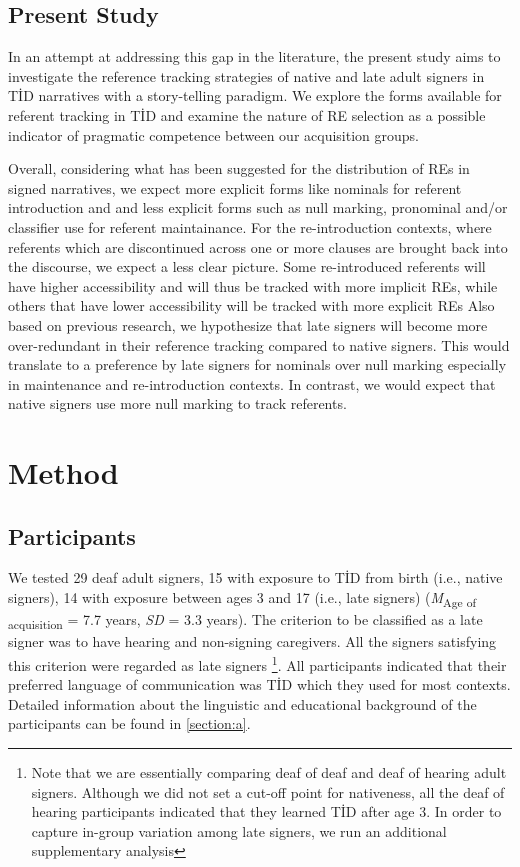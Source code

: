 \documentclass[]{elsarticle} %
\begin{document}
\hypertarget{present-study}{%
\subsection{Present Study}\label{present-study}}

In an attempt at addressing this gap in the literature, the present
study aims to investigate the reference tracking strategies of native
and late adult signers in TİD narratives with a story-telling paradigm.
We explore the forms available for referent tracking in TİD and examine
the nature of RE selection as a possible indicator of pragmatic
competence between our acquisition groups.

Overall, considering what has been suggested for the distribution of REs
in signed narratives, we expect more explicit forms like nominals for
referent introduction and and less explicit forms such as null marking,
pronominal and/or classifier use for referent maintainance. For the
re-introduction contexts, where referents which are discontinued across
one or more clauses are brought back into the discourse, we expect a
less clear picture. Some re-introduced referents will have higher
accessibility and will thus be tracked with more implicit REs, while
others that have lower accessibility will be tracked with more explicit
REs Also based on previous research, we hypothesize that late signers
will become more over-redundant in their reference tracking compared to
native signers. This would translate to a preference by late signers for
nominals over null marking especially in maintenance and re-introduction
contexts. In contrast, we would expect that native signers use more null
marking to track referents.

\hypertarget{method}{%
\section{Method}\label{method}}

\hypertarget{participants}{%
\subsection{Participants}\label{participants}}

We tested 29 deaf adult signers, 15 with exposure to TİD from birth
(i.e., native signers), 14 with exposure between ages 3 and 17 (i.e.,
late signers) (\emph{M}\textsubscript{Age of acquisition} = 7.7 years,
\emph{SD} = 3.3 years). The criterion to be classified as a late signer
was to have hearing and non-signing caregivers. All the signers
satisfying this criterion were regarded as late signers
\footnote{Note that we are essentially comparing deaf of deaf and deaf of hearing adult signers. Although we did not set a cut-off point for nativeness, all the deaf of hearing participants indicated that they learned TİD after age 3. In order to capture in-group variation among late signers, we run an additional supplementary analysis}.
All participants indicated that their preferred language of
communication was TİD which they used for most contexts. Detailed
information about the linguistic and educational background of the
participants can be found in \ref{section:a}.
\end{document}
